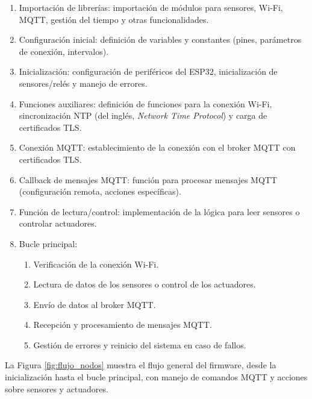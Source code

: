 \begin{enumerate}
    \item Importación de librerías: importación de módulos para sensores, Wi-Fi, MQTT,
          gestión del tiempo y otras funcionalidades.
    \item Configuración inicial: definición de variables y constantes (pines, parámetros
          de conexión, intervalos).
    \item Inicialización: configuración de periféricos del ESP32, inicialización de
          sensores/relés y manejo de errores.
    \item Funciones auxiliares: definición de funciones para la conexión Wi-Fi,
          sincronización NTP (del inglés, \textit{Network Time Protocol}) y carga de
          certificados TLS.
    \item Conexión MQTT: establecimiento de la conexión con el broker MQTT con
          certificados TLS.
    \item Callback de mensajes MQTT: función para procesar mensajes MQTT (configuración
          remota, acciones específicas).
    \item Función de lectura/control: implementación de la lógica para leer sensores o
          controlar actuadores.
    \item Bucle principal:
          \begin{enumerate}
              \item Verificación de la conexión Wi-Fi.
              \item Lectura de datos de los sensores o control de los actuadores.
              \item Envío de datos al broker MQTT.
              \item Recepción y procesamiento de mensajes MQTT.
              \item Gestión de errores y reinicio del sistema en caso de fallos.
          \end{enumerate}
\end{enumerate}

La Figura \ref{fig:flujo_nodos} muestra el flujo general del firmware, desde la
inicialización hasta el bucle principal, con manejo de comandos MQTT y acciones
sobre sensores y actuadores.


